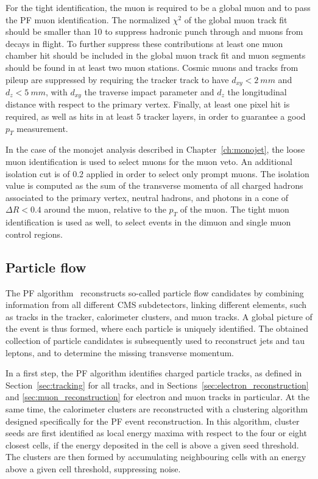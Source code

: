 For the tight identification, the muon is required to be a global muon and to pass the \ac{PF} muon identification. The normalized $\chi^2$ of the global muon track fit should be smaller than 10 to suppress hadronic punch through and muons from decays in flight. To further suppress these contributions at least one muon chamber hit should be included in the global muon track fit and muon segments should be found in at least two muon stations. Cosmic muons and tracks from pileup are suppressed by requiring the tracker track to have $d_{xy} < \SI{2}{mm}$ and $d_z < \SI{5}{mm}$, with $d_{xy}$ the traverse impact parameter and $d_z$ the longitudinal distance with respect to the primary vertex. Finally, at least one pixel hit is required, as well as hits in at least 5 tracker layers, in order to guarantee a good $p_T$ measurement.

In the case of the monojet analysis described in Chapter~\ref{ch:monojet}, the loose muon identification is used to select muons for the muon veto. An additional isolation cut is of 0.2 applied in order to select only prompt muons. The isolation value is computed as the sum of the transverse momenta of all charged hadrons associated to the primary vertex, neutral hadrons, and photons in a cone of $\Delta R < 0.4$ around the muon, relative to the $p_T$ of the muon. The tight muon identification is used as well, to select events in the dimuon and single muon control regions. 

\subsection{Particle flow}
\label{sec:PF}

The \acf{PF} algorithm~\cite{CMS-PRF-14-001} reconstructs so-called particle flow candidates by combining information from all different \ac{CMS} subdetectors, linking different elements, such as tracks in the tracker, calorimeter clusters, and muon tracks. A global picture of the event is thus formed, where each particle is uniquely identified. The obtained collection of particle candidates is subsequently used to reconstruct jets and tau leptons, and to determine the missing transverse momentum.

In a first step, the \ac{PF} algorithm identifies charged particle tracks, as defined in Section~\ref{sec:tracking} for all tracks, and in Sections~\ref{sec:electron_reconstruction} and \ref{sec:muon_reconstruction} for electron and muon tracks in particular. At the same time, the calorimeter clusters are reconstructed with a clustering algorithm designed specifically for the \ac{PF} event reconstruction. In this algorithm, cluster seeds are first identified as local energy maxima with respect to the four or eight closest cells, if the energy deposited in the cell is above a given seed threshold. The clusters are then formed by accumulating neighbouring cells with an energy above a given cell threshold, suppressing noise.

